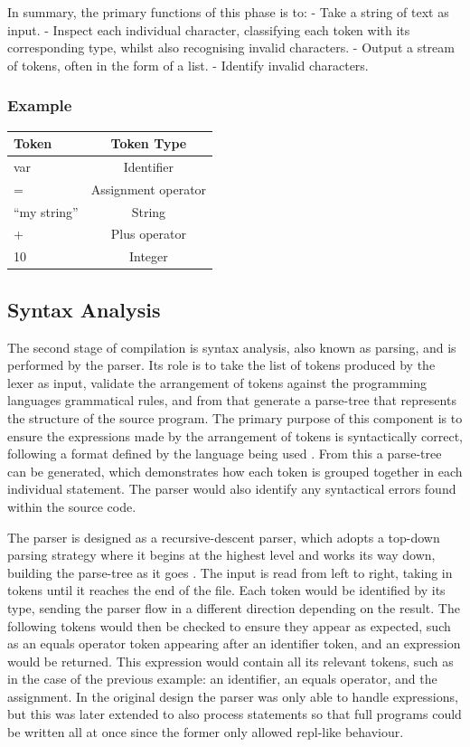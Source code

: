 \documentclass[
]{report}
\begin{document}
In summary, the primary functions of this phase is to: - Take a string
of text as input. - Inspect each individual character, classifying each
\gls{token} with its corresponding type, whilst also recognising invalid
characters. - Output a stream of \glspl{token}, often in the form of a list. -
Identify invalid characters.

\subsubsection{Example}
\begin{longtable}[l]{@{}lc@{}}
\toprule
Token & Token Type\tabularnewline
\midrule
\endhead
var & Identifier\tabularnewline
= & Assignment operator\tabularnewline
``my string'' & String\tabularnewline
+ & Plus operator\tabularnewline
10 & Integer\tabularnewline
\bottomrule
\end{longtable}

\subsection{Syntax Analysis}
The second stage of compilation is syntax analysis, also known as
\gls{parsing}, and is performed by the parser. Its role is to take the list of
\glspl{token} produced by the lexer as input, validate the arrangement of
\glspl{token} against the programming languages grammatical rules, and from
that generate a \gls{parse-tree} that represents the structure of the source
program. The primary purpose of this component is to ensure the
\glspl{expression} made by the arrangement of \glspl{token} is syntactically correct,
following a format defined by the language being used \cite{tutorials-guide}. From this
a \gls{parse-tree} can be generated, which demonstrates how each \gls{token} is
grouped together in each individual \gls{statement}. The parser would also
identify any syntactical errors found within the source code.

The parser is designed as a \gls{recursive-descent parser}, which adopts a
top-down \gls{parsing} strategy where it begins at the highest level and works
its way down, building the \gls{parse-tree} as it goes \cite{geeks-website}. The input is
read from left to right, taking in \glspl{token} until it reaches the end of
the file. Each \gls{token} would be identified by its type, sending the parser
flow in a different direction depending on the result. The following
\glspl{token} would then be checked to ensure they appear as expected, such as
an equals operator \gls{token} appearing after an \gls{identifier} \gls{token}, and an
\gls{expression} would be returned. This \gls{expression} would contain all its
relevant \glspl{token}, such as in the case of the previous example: an
\gls{identifier}, an equals operator, and the assignment. In the original
design the parser was only able to handle \glspl{expression}, but this was
later extended to also process \glspl{statement} so that full programs could be
written all at once since the former only allowed \acrshort{repl}-like behaviour.
\end{document}
